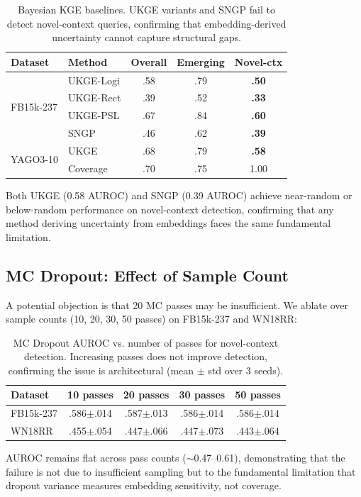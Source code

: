 \documentclass{article}
\begin{document}
\begin{table}[h]
\centering
\caption{Bayesian KGE baselines. UKGE variants and SNGP fail to detect novel-context queries, confirming that embedding-derived uncertainty cannot capture structural gaps.}
\label{tab:bayesian_baselines}
\begin{tabular}{llccc}
\toprule
Dataset & Method & Overall & Emerging & Novel-ctx \\
\midrule
\multirow{4}{*}{FB15k-237}
& UKGE-Logi & .58 & .79 & \textbf{.50} \\
& UKGE-Rect & .39 & .52 & \textbf{.33} \\
& UKGE-PSL & .67 & .84 & \textbf{.60} \\
& SNGP & .46 & .62 & \textbf{.39} \\
\midrule
\multirow{2}{*}{YAGO3-10}
& UKGE & .68 & .79 & \textbf{.58} \\
& Coverage & .70 & .75 & 1.00 \\
\bottomrule
\end{tabular}
\end{table}

Both UKGE (0.58 AUROC) and SNGP (0.39 AUROC) achieve near-random or below-random performance on novel-context detection, confirming that any method deriving uncertainty from embeddings faces the same fundamental limitation.

\subsection{MC Dropout: Effect of Sample Count}

A potential objection is that 20 MC passes may be insufficient. We ablate over sample counts (10, 20, 30, 50 passes) on FB15k-237 and WN18RR:

\begin{table}[h]
\centering
\caption{MC Dropout AUROC vs. number of passes for novel-context detection. Increasing passes does not improve detection, confirming the issue is architectural (mean $\pm$ std over 3 seeds).}
\label{tab:mc_ablation}
\begin{tabular}{lcccc}
\toprule
Dataset & 10 passes & 20 passes & 30 passes & 50 passes \\
\midrule
FB15k-237 & .586$\pm$.014 & .587$\pm$.013 & .586$\pm$.014 & .586$\pm$.014 \\
WN18RR & .455$\pm$.054 & .447$\pm$.066 & .447$\pm$.073 & .443$\pm$.064 \\
\bottomrule
\end{tabular}
\end{table}

AUROC remains flat across pass counts ($\sim$0.47--0.61), demonstrating that the failure is not due to insufficient sampling but to the fundamental limitation that dropout variance measures embedding sensitivity, not coverage.
\end{document}
